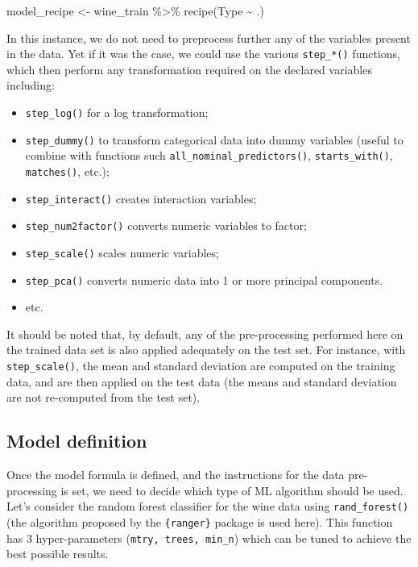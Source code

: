 \documentclass[
]{krantz}
\makeatletter
\newenvironment{Shaded}{\begin{snugshade}}{\end{snugshade}}
\newcommand{\FunctionTok}[1]{\textcolor[rgb]{0,0,0}{#1}}
\newcommand{\NormalTok}[1]{#1}
\newcommand{\OtherTok}[1]{\textcolor[rgb]{0.37,0.37,0.37}{#1}}
\newcommand{\SpecialCharTok}[1]{\textcolor[rgb]{0,0,0}{#1}}
\providecommand{\tightlist}{%
  \setlength{\itemsep}{0pt}\setlength{\parskip}{0pt}}
\renewenvironment{quote}{\begin{VF}}{\end{VF}}
\newenvironment{kframe}{%
\medskip{}
\setlength{\fboxsep}{.8em}
 \def\at@end@of@kframe{}%
 \ifinner\ifhmode%
  \def\at@end@of@kframe{\end{minipage}}%
  \begin{minipage}{\columnwidth}%
 \fi\fi%
 \def\FrameCommand##1{\hskip\@totalleftmargin \hskip-\fboxsep
 \colorbox{shadecolor}{##1}\hskip-\fboxsep
     \hskip-\linewidth \hskip-\@totalleftmargin \hskip\columnwidth}%
 \MakeFramed {\advance\hsize-\width
   \@totalleftmargin\z@ \linewidth\hsize
   \@setminipage}}%
 {\par\unskip\endMakeFramed%
 \at@end@of@kframe}
\renewenvironment{Shaded}{\begin{kframe}}{\end{kframe}}
\makeatother
\begin{document}
\begin{Shaded}
\begin{Highlighting}[]
\NormalTok{model\_recipe }\OtherTok{\textless{}{-}}\NormalTok{ wine\_train }\SpecialCharTok{\%\textgreater{}\%} 
  \FunctionTok{recipe}\NormalTok{(Type }\SpecialCharTok{\textasciitilde{}}\NormalTok{ .)}
\end{Highlighting}
\end{Shaded}

In this instance, we do not need to preprocess further any of the variables present in the data. Yet if it was the case, we could use the various \texttt{step\_*()} functions, which then perform any transformation required on the declared variables including:

\begin{itemize}
\tightlist
\item
  \texttt{step\_log()} for a log transformation;
\item
  \texttt{step\_dummy()} to transform categorical data into dummy variables (useful to combine with functions such \texttt{all\_nominal\_predictors()}, \texttt{starts\_with()}, \texttt{matches()}, etc.);
\item
  \texttt{step\_interact()} creates interaction variables;
\item
  \texttt{step\_num2factor()} converts numeric variables to factor;
\item
  \texttt{step\_scale()} scales numeric variables;
\item
  \texttt{step\_pca()} converts numeric data into 1 or more principal components.
\item
  etc.
\end{itemize}

\begin{quote}
It should be noted that, by default, any of the pre-processing performed here on the trained data set is also applied adequately on the test set. For instance, with \texttt{step\_scale()}, the mean and standard deviation are computed on the training data, and are then applied on the test data (the means and standard deviation are not re-computed from the test set).
\end{quote}

\hypertarget{model-definition}{%
\subsection{Model definition}\label{model-definition}}

Once the model formula is defined, and the instructions for the data pre-processing is set, we need to decide which type of ML algorithm should be used. Let's consider the random forest classifier for the wine data using \texttt{rand\_forest()} (the algorithm proposed by the \texttt{\{ranger\}} package is used here). This function has 3 hyper-parameters (\texttt{mtry,\ trees,\ min\_n}) which can be tuned to achieve the best possible results.
\end{document}
